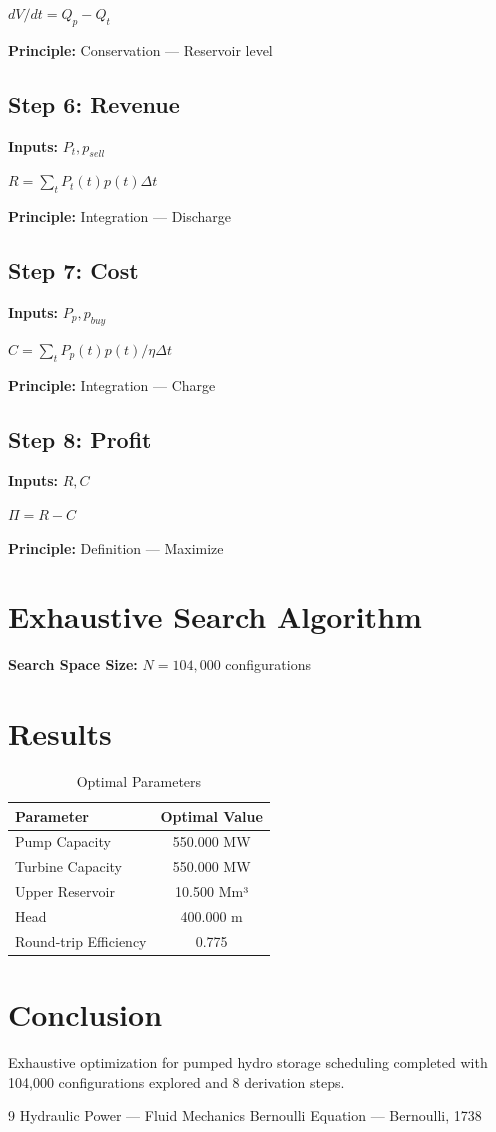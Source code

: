 \documentclass[11pt,twocolumn]{article}
\begin{document}
$dV/dt = Q_p - Q_t$

\textbf{Principle:} Conservation --- Reservoir level

\subsection*{Step 6: Revenue}
\textbf{Inputs:} $P_t, p_{sell}$

$R = \sum_t P_t(t) p(t) \Delta t$

\textbf{Principle:} Integration --- Discharge

\subsection*{Step 7: Cost}
\textbf{Inputs:} $P_p, p_{buy}$

$C = \sum_t P_p(t) p(t) / \eta \Delta t$

\textbf{Principle:} Integration --- Charge

\subsection*{Step 8: Profit}
\textbf{Inputs:} $R, C$

$\Pi = R - C$

\textbf{Principle:} Definition --- Maximize


\section{Exhaustive Search Algorithm}

\textbf{Search Space Size:} $N = 104,000$ configurations

\section{Results}

\begin{table}[h]
\centering
\caption{Optimal Parameters}
\begin{tabular}{@{}lc@{}}
\toprule
Parameter & Optimal Value \\
\midrule
Pump Capacity & 550.000 MW \\
Turbine Capacity & 550.000 MW \\
Upper Reservoir & 10.500 Mm³ \\
Head & 400.000 m \\
Round-trip Efficiency & 0.775  \\
\bottomrule
\end{tabular}
\end{table}

\section{Conclusion}
Exhaustive optimization for pumped hydro storage scheduling completed with 104,000 configurations explored and 8 derivation steps.

\begin{thebibliography}{9}
 Hydraulic Power --- Fluid Mechanics
 Bernoulli Equation --- Bernoulli, 1738
\end{thebibliography}
\end{document}
